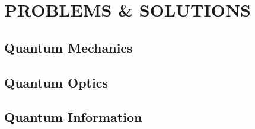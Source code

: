 \documentclass{book}
\theoremstyle{definition}
\begin{document}
\chapter{PROBLEMS \& SOLUTIONS}

\newpage

\section{Quantum Mechanics}

\newpage

\section{Quantum Optics}

\newpage

\section{Quantum Information}



\newpage

\end{document}
